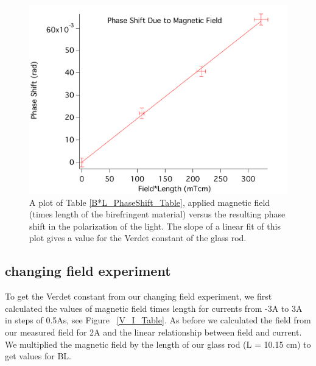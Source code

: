 \documentclass[prb,preprint]{revtex4-1}
\begin{document}
\begin{figure}[h!]
\centering
\includegraphics[width=5in]{PhaseShift_B-L_Plot.pdf}
\caption{A plot of Table \ref{B*L_PhaseShift_Table}, applied magnetic field (times length of the birefringent material) versus the resulting phase shift in the polarization of the light. The slope of a linear fit of this plot gives a value for the Verdet constant of the glass rod. }
\label{PhaseShift_B*L_Plot}
\end{figure}


\subsection{changing field experiment}

To get the Verdet constant from our changing field experiment, we first calculated the values of magnetic field times length for currents from -3A to 3A in steps of 0.5As, see Figure ~\ref{V_I_Table}. As before we calculated the field from our measured field for 2A and the linear relationship between field and current. We multiplied the magnetic field by the length of our glass rod (L = 10.15 cm) to get values for BL. 
\end{document}
